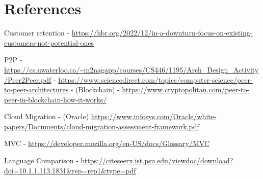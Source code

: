 \section{References}

Customer retention 
  - \url{https://hbr.org/2022/12/in-a-downturn-focus-on-existing-customers-not-potential-ones}

P2P
  - \url{https://cs.uwaterloo.ca/~m2nagapp/courses/CS446/1195/Arch_Design_Activity/Peer2Peer.pdf}
  - \url{https://www.sciencedirect.com/topics/computer-science/peer-to-peer-architectures}
  - (Blockchain) - \url{https://www.cryptopolitan.com/peer-to-peer-in-blockchain-how-it-works/}

Cloud Migration
  - (Oracle) \url{https://www.infosys.com/Oracle/white-papers/Documents/cloud-migration-assessment-framework.pdf}

MVC
  - \url{https://developer.mozilla.org/en-US/docs/Glossary/MVC}

Language Comparison
 - \url{https://citeseerx.ist.psu.edu/viewdoc/download?doi=10.1.1.113.1831&rep=rep1&type=pdf}
 
\newpage
